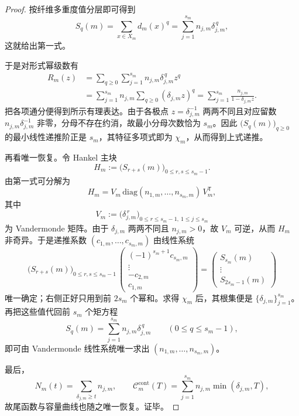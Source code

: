 \begin{proof}
按纤维多重度值分层即可得到
\[
S_q(m)=\sum_{x\in X_m}d_m(x)^q=\sum_{j=1}^{s_m}n_{j,m}\delta_{j,m}^{\,q},
\]
这就给出第一式。
\par
于是对形式幂级数有
\[
\begin{aligned}
R_m(z)
&=
\sum_{q\ge 0}\sum_{j=1}^{s_m}n_{j,m}\delta_{j,m}^{\,q}z^q\\
&=
\sum_{j=1}^{s_m}n_{j,m}\sum_{q\ge 0}(\delta_{j,m}z)^q
=
\sum_{j=1}^{s_m}\frac{n_{j,m}}{1-\delta_{j,m}z}.
\end{aligned}
\]
把各项通分便得到所示有理表达。由于各极点 \(z=\delta_{j,m}^{-1}\) 两两不同且对应留数 \(n_{j,m}\delta_{j,m}^{-1}\) 非零，分母不存在约消，故最小分母次数恰为 \(s_m\)。因此 \(\bigl(S_q(m)\bigr)_{q\ge 0}\) 的最小线性递推阶正是 \(s_m\)，其特征多项式即为 \(\chi_m\)，从而得到上式递推。
\par
再看唯一恢复。令 Hankel 主块
\[
H_m:=\bigl(S_{r+s}(m)\bigr)_{0\le r,s\le s_m-1}.
\]
由第一式可分解为
\[
H_m=V_m\,\mathrm{diag}(n_{1,m},\dots,n_{s_m,m})\,V_m^{\mathsf T},
\]
其中
\[
V_m:=\bigl(\delta_{j,m}^{\,r}\bigr)_{0\le r\le s_m-1,\ 1\le j\le s_m}
\]
为 Vandermonde 矩阵。由于 \(\delta_{j,m}\) 两两不同且 \(n_{j,m}>0\)，故 \(V_m\) 可逆，从而 \(H_m\) 非奇异。于是递推系数 \((c_{1,m},\dots,c_{s_m,m})\) 由线性系统
\[
\bigl(S_{r+s}(m)\bigr)_{0\le r,s\le s_m-1}\,
\begin{pmatrix}
(-1)^{s_m+1}c_{s_m,m}\\
\vdots\\
-c_{2,m}\\
c_{1,m}
\end{pmatrix}
=
\begin{pmatrix}
S_{s_m}(m)\\
\vdots\\
S_{2s_m-1}(m)
\end{pmatrix}
\]
唯一确定；右侧正好只用到前 \(2s_m\) 个幂和。求得 \(\chi_m\) 后，其根集便是 \(\{\delta_{j,m}\}_{j=1}^{s_m}\)。再把这些值代回前 \(s_m\) 个矩方程
\[
S_q(m)=\sum_{j=1}^{s_m}n_{j,m}\delta_{j,m}^{\,q}
\qquad(0\le q\le s_m-1),
\]
即可由 Vandermonde 线性系统唯一求出 \((n_{1,m},\dots,n_{s_m,m})\)。
\par
最后，
\[
N_m(t)=\sum_{\delta_{j,m}\ge t}n_{j,m},
\qquad
\mathcal C_m^{\mathrm{cont}}(T)=\sum_{j=1}^{s_m}n_{j,m}\min(\delta_{j,m},T),
\]
故尾函数与容量曲线也随之唯一恢复。证毕。
\end{proof}

